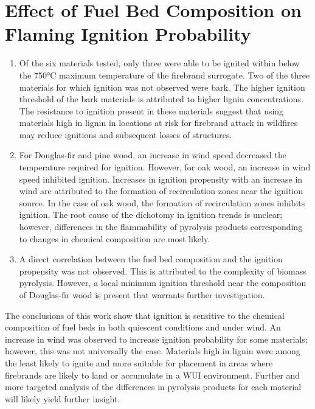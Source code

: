 \section{Effect of Fuel Bed Composition on Flaming Ignition Probability}
        \begin{enumerate}
            \item Of the six materials tested, only three were able to be ignited within below the 750\si{\celsius} maximum temperature of the firebrand surrogate. Two of the three materials for which ignition was not observed were bark. The higher ignition threshold of the bark materials is attributed to higher lignin concentrations. The resistance to ignition present in these materials suggest that using materials high in lignin in locations at risk for firebrand attack in wildfires may reduce ignitions and subsequent losses of structures.
            
            \item For Douglas-fir and pine wood, an increase in wind speed decreased the temperature required for ignition. However, for oak wood, an increase in wind speed inhibited ignition. Increases in ignition propensity with an increase in wind are attributed to the formation of recirculation zones near the ignition source. In the case of oak wood, the formation of recirculation zones inhibits ignition. The root cause of the dichotomy in ignition trends is unclear; however, differences in the flammability of pyrolysis products corresponding to changes in chemical composition are most likely.
            
            \item A direct correlation between the fuel bed composition and the ignition propensity was not observed. This is attributed to the complexity of biomass pyrolysis. However, a local minimum ignition threshold near the composition of Douglas-fir wood is present that warrants further investigation. 
        \end{enumerate}
    The conclusions of this work show that ignition is sensitive to the chemical composition of fuel beds in both quiescent conditions and under wind. An increase in wind was observed to increase ignition probability for some materials; however, this was not universally the case. Materials high in lignin were among the least likely to ignite and more suitable for placement in areas where firebrands are likely to land or accumulate in a WUI environment. Further and more targeted analysis of the differences in pyrolysis products for each material will likely yield further insight. 

